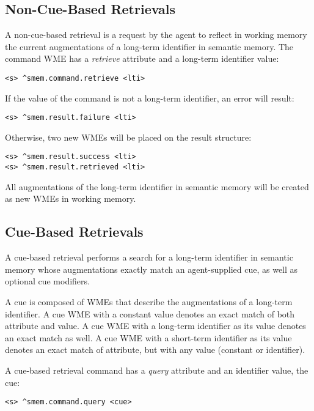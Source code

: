 \subsection{Non-Cue-Based Retrievals}
A non-cue-based retrieval is a request by the agent to reflect in working memory the current augmentations of a long-term identifier in semantic memory. 
The command WME has a \emph{retrieve} attribute and a long-term identifier value:

\begin{verbatim}
<s> ^smem.command.retrieve <lti>
\end{verbatim}

If the value of the command is not a long-term identifier, an error will result: 

\begin{verbatim}
<s> ^smem.result.failure <lti>
\end{verbatim}

Otherwise, two new WMEs will be placed on the result structure:

\begin{verbatim}
<s> ^smem.result.success <lti>
<s> ^smem.result.retrieved <lti>
\end{verbatim}

All augmentations of the long-term identifier in semantic memory will be created as new WMEs in working memory.

\subsection{Cue-Based Retrievals}
A cue-based retrieval performs a search for a long-term identifier in semantic memory whose augmentations exactly match an agent-supplied cue, as well as optional cue modifiers.

A cue is composed of WMEs that describe the augmentations of a long-term identifier.  
A cue WME with a constant value denotes an exact match of both attribute and value.  
A cue WME with a long-term identifier as its value denotes an exact match as well.  
A cue WME with a short-term identifier as its value denotes an exact match of attribute, but with any value (constant or identifier).  

A cue-based retrieval command has a \emph{query} attribute and an identifier value, the cue:

\begin{verbatim}
<s> ^smem.command.query <cue>
\end{verbatim}

